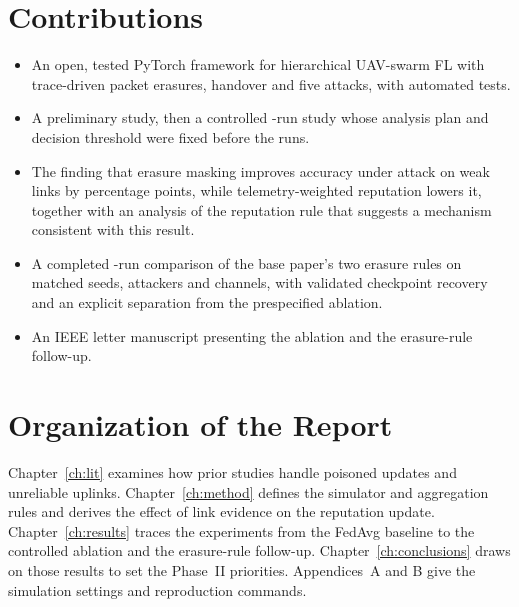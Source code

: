 \section{Contributions}
\begin{itemize}
\item An open, tested PyTorch framework for hierarchical UAV-swarm FL with
  trace-driven packet erasures, handover and five attacks, with automated tests.
\item A preliminary study, then a controlled \NumRuns-run study whose analysis plan
  and decision threshold were fixed before the runs.
\item The finding that erasure masking improves accuracy under attack on weak links
  by \MaskGain{} percentage points, while telemetry-weighted reputation lowers it,
  together with an analysis of the reputation rule that suggests a mechanism
  consistent with this result.
\item A completed \BpNumRuns-run comparison of the base paper's two erasure rules
  on matched seeds, attackers and channels, with validated checkpoint recovery and
  an explicit separation from the prespecified ablation.
\item An IEEE letter manuscript presenting the ablation and the erasure-rule follow-up.
\end{itemize}

\section{Organization of the Report}
Chapter~\ref{ch:lit} examines how prior studies handle poisoned updates and unreliable
uplinks. Chapter~\ref{ch:method} defines the simulator and aggregation rules and
derives the effect of link evidence on the reputation update.
Chapter~\ref{ch:results} traces the experiments from the FedAvg baseline to the
controlled ablation and the erasure-rule follow-up.
Chapter~\ref{ch:conclusions} draws on those results to set the Phase~II priorities.
Appendices~A and B give the simulation settings and reproduction commands.
